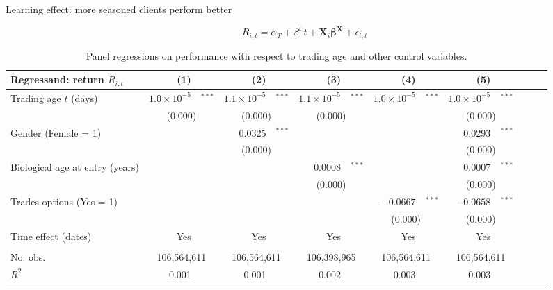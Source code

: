\documentclass{beamer}
\begin{document}
\begin{frame}{Learning effect: more seasoned clients perform better}

\begin{equation}
\label{eq:rregress}
R_{i,t} = \alpha_T + \beta^{t} \, t +  \bm{X}_i \bm{\beta}^{\bm{X}} + \epsilon_{i,t}
\end{equation}

	\begin{table}[h!]
		\centering
		\caption{Panel regressions on performance with respect to trading age and other control variables.}
		\tiny
		\setlength{\tabcolsep}{0.5pt}
		\begin{tabular}{@{}lr@{}lr@{}lr@{}lr@{}lr@{}lr@{}l@{}l}
			\toprule
			Regressand: return $R_{i,t}$      & (1)   &       & (2)   &       & (3)   &       & (4)   &       & (5)   &  \\
			\midrule
			Trading age $t$ (days) & $1.0 \times 10^{-5}$ & $^{***}$   & $1.1 \times 10^{-5}$ & $^{***}$   & $1.1 \times 10^{-5}$ & $^{***}$   & $1.0 \times 10^{-5}$ & $^{***}$   & $1.0 \times 10^{-5}$ & $^{***}$ \\
			& \multicolumn{2}{c}{(0.000)} & \multicolumn{2}{c}{(0.000)} & \multicolumn{2}{c}{(0.000)} & \multicolumn{2}{c}{} & \multicolumn{2}{c}{(0.000)} \\
			Gender (Female = 1) &       &       & 0.0325 & $^{***}$   &       &       &       &       & 0.0293 & $^{***}$ \\
			& \multicolumn{2}{c}{} & \multicolumn{2}{c}{(0.000)} & \multicolumn{2}{c}{} & \multicolumn{2}{c}{} & \multicolumn{2}{c}{(0.000)} \\
			Biological age at entry (years) &       &       &       &       & 0.0008 & $^{***}$   &       &       & 0.0007 & $^{***}$ \\
			& \multicolumn{2}{c}{} & \multicolumn{2}{c}{} & \multicolumn{2}{c}{(0.000)} & \multicolumn{2}{c}{} & \multicolumn{2}{c}{(0.000)} \\
			Trades options (Yes = 1) &       &       &       &       &       &       & $-0.0667$ & $^{***}$   & $-0.0658$ & $^{***}$ \\
			& \multicolumn{2}{c}{} & \multicolumn{2}{c}{} & \multicolumn{2}{c}{} & \multicolumn{2}{c}{(0.000)} & \multicolumn{2}{c}{(0.000)} \\

			Time effect (dates) & Yes   &       & Yes   &       & Yes   &       & Yes   &       & Yes   &  \\
			&       &       &       &       &       &       &       &       &       &  \\
			No. obs.     & \multicolumn{2}{c}{      106,564,611 } & \multicolumn{2}{c}{      106,564,611 } & \multicolumn{2}{c}{      106,398,965 } & \multicolumn{2}{c}{      106,564,611 } & \multicolumn{2}{c}{      106,564,611 } \\
			$R^2$    & 0.001 &       & 0.001 &       & 0.002 &       & 0.003 &       & 0.003 &  \\
			\bottomrule
		\end{tabular}%
	\end{table}%


\end{frame}
\end{document}
